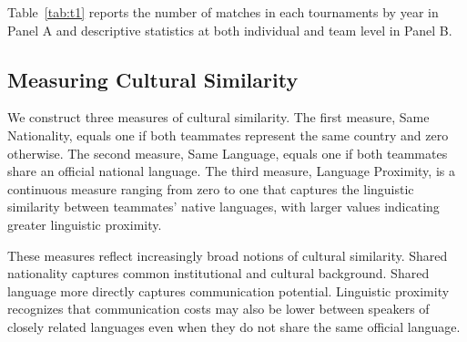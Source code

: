 \documentclass[10pt]{article}
\begin{document}
Table~\ref{tab:t1} reports the number of matches in each tournaments by year in Panel A and descriptive statistics at both individual and team level in Panel B. 


\subsection{Measuring Cultural Similarity}
We construct three  measures of cultural similarity. The first measure, Same Nationality, equals one if both teammates represent the same country and zero otherwise. The second measure, Same Language, equals one if both teammates share an official national language. The third measure, Language Proximity, is a continuous measure ranging from zero to one that captures the linguistic similarity between teammates' native languages, with larger values indicating greater linguistic proximity.

These measures reflect increasingly broad notions of cultural similarity. Shared nationality captures common institutional and cultural background. Shared language more directly captures communication potential. Linguistic proximity recognizes that communication costs may also be lower between speakers of closely related languages even when they do not share the same official language.
\end{document}
